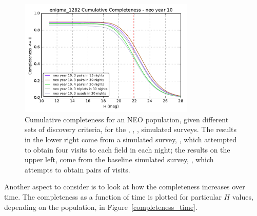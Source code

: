 \begin{figure}
\includegraphics[width=3.3in]{figs/solarsystem/enigma_1282_CumulativeCompleteness_NEO_ComboMetricVsH.pdf}
%
\caption{Cumulative completeness for an NEO population, given
  different sets of discovery criteria, for the , ,
,
 simulated surveys. The results in the
lower right come from a simulated survey, ,
which attempted to obtain four visits to each field in each
night; the results on the upper left, come from the baseline simulated
survey, , which attempts to obtain pairs of
visits.
\label{completeness_changes}}
\end{figure}

Another aspect to consider is to look at how the completeness
increases over time. The completeness as a function of time is plotted
for particular $H$ values, depending on the
population, in Figure~\ref{completeness_time}.

